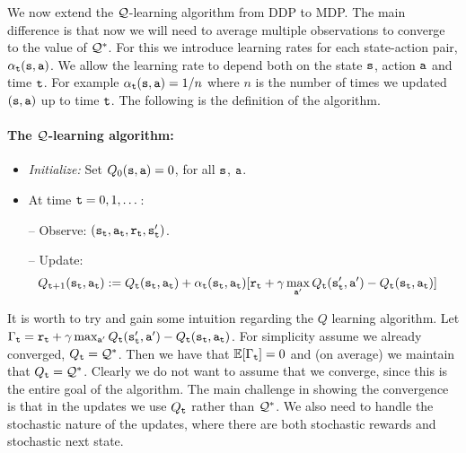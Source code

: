 We now extend the $\mathcal{Q}$-learning algorithm from DDP to MDP. The main
difference is that now we will need to average multiple observations
to converge to the value of $\mathcal{Q}^*$. For this we introduce
learning rates for each state-action pair, $\alpha_{\tt t}({\tt s},{\tt a})$. We allow the
learning rate to depend both on the state ${\tt s}$, action ${\tt a}$
and time ${\tt t}$. For example $\alpha_{\tt t}({\tt s},{\tt a})=1/n$
where $n$ is the number of times we updated $({\tt s},{\tt a})$ up to
time ${\tt t}$. The following is the definition of the algorithm.

\paragraph{The $\mathcal{Q}$-learning algorithm:}

\begin{itemize}
\item {\em Initialize:} Set $ Q_0({\tt s},{\tt a})=0$, for all ${\tt s}$, ${\tt a}$.

\item At time ${\tt t}=0,1,\dots$:

-- Observe: $({\tt s}_{\tt t}, {\tt a}_{\tt t}, {\tt r}_{\tt t},
{\tt s}_{{\tt t}}')$.

-- Update: %
\begin{align*}
 Q_{{\tt t}+1}({\tt s}_{\tt t},{\tt a}_{\tt t}) & :=
 Q_{\tt t} ({\tt s}_{\tt t},{\tt a}_{\tt t}) + \alpha_{\tt t}({\tt s}_{\tt t},{\tt a}_{\tt t})  [{\tt r}_{\tt t} +
\gamma \max_{{\tt a}'} Q_{\tt t} ({\tt s}_{{\tt t}}', {\tt a}')
-Q_{\tt t} ({\tt s}_{\tt t},{\tt a}_{\tt t})]
\end{align*}
\end{itemize}


It is worth to try and gain some intuition regarding the $Q$
learning algorithm. Let $\Gamma_{\tt t}= {\tt r}_{\tt t} + \gamma
\max_{{\tt a}'} Q_{\tt t} ({\tt s}_{{\tt t}}', {\tt a}')-Q_{\tt t}
({\tt s}_{\tt t},{\tt a}_{\tt t})$.
%
For simplicity assume we already converged,
%
$Q_{\tt t}=\mathcal{Q}^*$. Then we have that $\mathbb{E}[\Gamma_{\tt t}]=0$ and (on
average) we maintain that $Q_{\tt t}=\mathcal{Q}^*$.
%
Clearly we do not want to assume that we converge, since this is the
entire goal of the algorithm.
%
The main challenge in showing the convergence is that in the updates
we use $Q_{\tt t}$ rather than $\mathcal{Q}^*$. We also need to handle the
stochastic nature of the updates, where there are both stochastic
rewards and stochastic next state.

